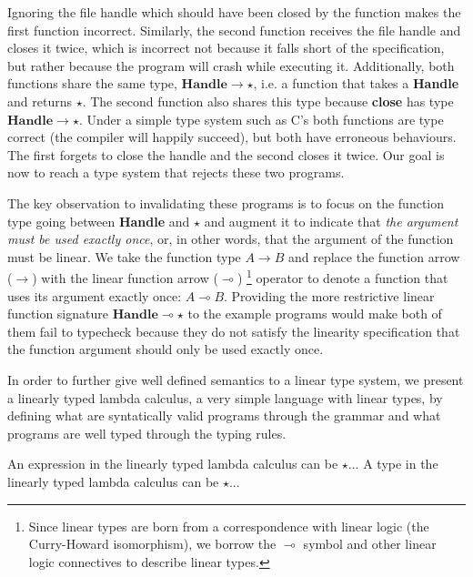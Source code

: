 \documentclass[]{lwnovathesis}
\newcommand{\lolli}{\multimap}
\begin{document}
Ignoring the file handle which should have been closed by the function makes the
first function incorrect. Similarly, the second function receives the file handle and
closes it twice, which is incorrect not because it falls short of the
specification, but rather because the program will crash while executing it.
%
Additionally, both functions share the same type, $\textbf{Handle} \to \star$, i.e.
a function that takes a \textbf{Handle} and returns $\star$. The second function also
shares this type because \textbf{close} has type $\textbf{Handle} \to \star$.
%
Under a simple type system such as C's both functions are type correct (the
compiler will happily succeed), but both have erroneous behaviours. The first
forgets to close the handle and the second closes it twice. Our goal is now to
reach a type system that rejects these two programs.

The key observation to invalidating these programs is to focus on the function
type going between \textbf{Handle} and $\star$ and augment it to indicate that
\emph{the argument must be used exactly once}, or, in other words, that the
argument of the function must be linear. We take the function type $A \to B$
and replace the function arrow ($\to$) with the linear function arrow ($\lolli$)
%
\footnote{Since linear types are born from a correspondence with linear
logic\cite{linear-logic} (the Curry-Howard isomorphism\cite{curry-howard}), we
borrow the $\lolli$ symbol and other linear logic connectives to describe linear
types.}
%
operator to denote a function that uses its argument exactly once: $A \lolli B$.
%
Providing the more restrictive linear function signature $\textbf{Handle} \lolli
\star$ to the example programs would make both of them fail to typecheck because
they do not satisfy the linearity specification that the function argument
should only be used exactly once.


In order to further give well defined semantics to a linear type system, we
present a linearly typed lambda calculus, a very simple language with linear
types, by defining what are syntatically valid programs through the grammar and
what programs are well typed through the typing rules.

An expression in the linearly typed lambda calculus can be $\star$...
A type in the linearly typed lambda calculus can be $\star$...
\end{document}
